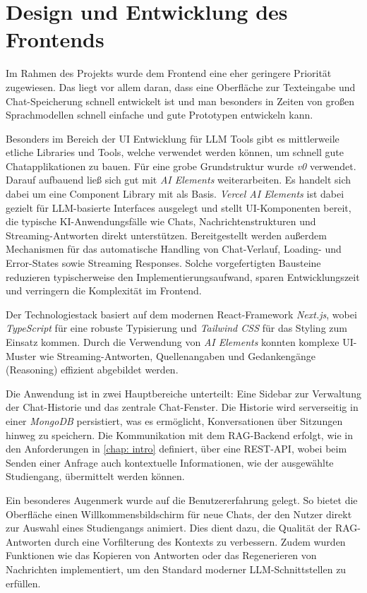 \chapter{Design und Entwicklung des Frontends}

Im Rahmen des Projekts wurde dem Frontend eine eher geringere Priorität zugewiesen.
Das liegt vor allem daran, dass eine Oberfläche zur Texteingabe und Chat-Speicherung
schnell entwickelt ist und man besonders in Zeiten von großen Sprachmodellen
schnell einfache und gute Prototypen entwickeln kann.

Besonders im Bereich der UI Entwicklung für LLM Tools gibt es mittlerweile
etliche Libraries und Tools, welche verwendet werden können, um schnell 
gute Chatapplikationen zu bauen. Für eine grobe Grundstruktur wurde \emph{v0} verwendet.
Darauf aufbauend ließ sich gut mit \emph{AI Elements} \cite{aielements} weiterarbeiten. 
Es handelt sich dabei um eine Component Library mit \cite{shadcn/ui} als Basis.
\emph{Vercel AI Elements} ist dabei gezielt für LLM-basierte Interfaces ausgelegt
und stellt UI-Komponenten bereit, die typische KI-Anwendungsfälle wie Chats,
Nachrichtenstrukturen und Streaming-Antworten direkt unterstützen. 
Bereitgestellt werden außerdem Mechanismen für das automatische Handling von
Chat-Verlauf, Loading- und Error-States sowie Streaming Responses. Solche
vorgefertigten Bausteine reduzieren typischerweise den Implementierungsaufwand,
sparen Entwicklungszeit und verringern die Komplexität im Frontend.

Der Technologiestack basiert auf dem modernen React-Framework \emph{Next.js}, wobei 
\emph{TypeScript} für eine robuste Typisierung und \emph{Tailwind CSS} für das 
Styling zum Einsatz kommen. Durch die Verwendung von \emph{AI Elements} konnten 
komplexe UI-Muster wie Streaming-Antworten, Quellenangaben und Gedankengänge 
(Reasoning) effizient abgebildet werden.

Die Anwendung ist in zwei Hauptbereiche unterteilt: Eine Sidebar zur Verwaltung 
der Chat-Historie und das zentrale Chat-Fenster. Die Historie wird serverseitig 
in einer \emph{MongoDB} persistiert, was es ermöglicht, Konversationen über 
Sitzungen hinweg zu speichern. Die Kommunikation mit dem RAG-Backend erfolgt, wie in den Anforderungen
in \ref{chap: intro} definiert,
über eine REST-API, wobei beim Senden einer Anfrage auch kontextuelle 
Informationen, wie der ausgewählte Studiengang, übermittelt werden können.

Ein besonderes Augenmerk wurde auf die Benutzererfahrung gelegt. So bietet die 
Oberfläche einen Willkommensbildschirm für neue Chats, der den Nutzer direkt 
zur Auswahl eines Studiengangs animiert. Dies dient dazu, die Qualität der 
RAG-Antworten durch eine Vorfilterung des Kontexts zu verbessern. Zudem wurden 
Funktionen wie das Kopieren von Antworten oder das Regenerieren von Nachrichten 
implementiert, um den Standard moderner LLM-Schnittstellen zu erfüllen.

